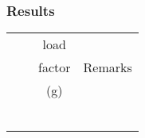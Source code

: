 % 
% 
%
\Large
\subsubsection*{Results}
  \settowidth{\colOne}{(USG)}
  \settowidth{\colTwo}{(KIAS)}
  \settowidth{\colFour}{Remarks}
  \begin{tabularx}{\textwidth}{|c|c|c|X|}
    \hline
    \multirow{3}{\colOne}{\centering{Fuel (USG)}}&\multirow{3}{\colTwo}{\centering{Speed (KIAS)}}&load&\multirow{3}{\colFour}{Remarks}\\
    &&factor&\\
    &&(g)&\\
    \hline
    \hline
    &&&\\
    \hline
    &&&\\
    \hline
    &&&\\
    \hline
    &&&\\
    \hline
    &&&\\
    \hline
    &&&\\
    \hline
    \end{tabularx}     
    \normalsize

   